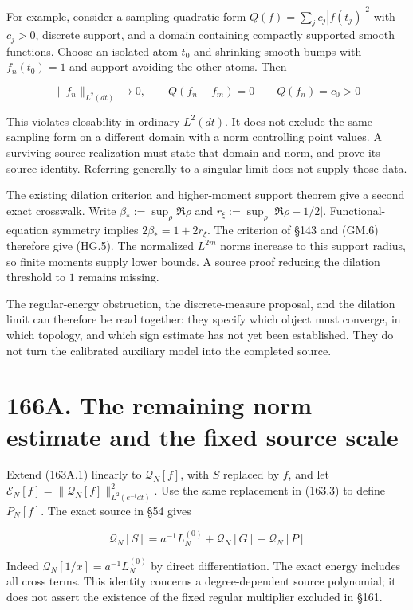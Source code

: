 \documentclass[
  11pt,
]{book}
\begin{document}
For example, consider a sampling quadratic form
\(Q(f)=\sum_jc_j|f(t_j)|^2\) with \(c_j>0\), discrete support, and a
domain containing compactly supported smooth functions. Choose an
isolated atom \(t_0\) and shrinking smooth bumps with \(f_n(t_0)=1\) and
support avoiding the other atoms. Then

\[
\|f_n\|_{L^2(dt)}\to0,\qquad Q(f_n-f_m)=0
\qquad Q(f_n)=c_0>0
\tag{166.1}
\]

This violates closability in ordinary \(L^2(dt)\). It does not exclude
the same sampling form on a different domain with a norm controlling
point values. A surviving source realization must state that domain and
norm, and prove its source identity. Referring generally to a singular
limit does not supply those data.

The existing dilation criterion and higher-moment support theorem give a
second exact crosswalk. Write \(\beta_*:=\sup_\rho\Re\rho\) and
\(r_\xi:=\sup_\rho|\Re\rho-1/2|\). Functional-equation symmetry implies
\(2\beta_*=1+2r_\xi\). The criterion of §143 and (GM.6) therefore give
(HG.5). The normalized \(L^{2m}\) norms increase to this support radius,
so finite moments supply lower bounds. A source proof reducing the
dilation threshold to \(1\) remains missing.

The regular-energy obstruction, the discrete-measure proposal, and the
dilation limit can therefore be read together: they specify which object
must converge, in which topology, and which sign estimate has not yet
been established. They do not turn the calibrated auxiliary model into
the completed source.

\section{166A. The remaining norm estimate and the fixed source
scale}\label{a.-the-remaining-norm-estimate-and-the-fixed-source-scale}

Extend (163A.1) linearly to \(\mathcal Q_N[f]\), with \(S\) replaced by
\(f\), and let
\(\mathscr E_N[f]=\|\mathcal Q_N[f]\|_{L^2(e^{-t}dt)}^2\). Use the same
replacement in (163.3) to define \(P_N[f]\). The exact source in §54
gives

\[
\mathcal Q_N[S]=a^{-1}L_N^{(0)}+\mathcal Q_N[G]-\mathcal Q_N[P]
\tag{166A.1}
\]

Indeed \(\mathcal Q_N[1/x]=a^{-1}L_N^{(0)}\) by direct differentiation.
The exact energy includes all cross terms. This identity concerns a
degree-dependent source polynomial; it does not assert the existence of
the fixed regular multiplier excluded in §161.
\end{document}
